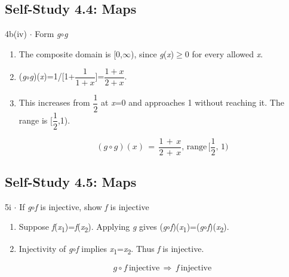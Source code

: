 \documentclass[11pt]{article}
\begin{document}
\begin{keepsection}\subsection{Self-Study 4.4: Maps}

\begin{workedbox}{4b(iv) \ensuremath{\cdot} Form \textit{g}\ensuremath{\circ}\textit{g}}
\begin{enumerate}
\item The composite domain is [0,\ensuremath{\infty}), since \textit{g}(\textit{x})\ensuremath{\geq}0 for every allowed \textit{x}.
\item (\textit{g}\ensuremath{\circ}\textit{g})(\textit{x})=1/[1+{\small\ensuremath{\dfrac{1}{1+{x}}}}]={\small\ensuremath{\dfrac{1+{x}}{2+{x}}}}.
\item {}
This increases from {\small\ensuremath{\dfrac{1}{2}}} at \textit{x}=0 and approaches 1 without reaching it. The range is [{\small\ensuremath{\dfrac{1}{2}}},1).

\begin{equation*}({g}\circ {g})({x})\, =\, \dfrac{1\, +\, {x}}{2\, +\, {x}},\, \text{range}\, [\dfrac{1}{2},\, 1)\end{equation*}
\end{enumerate}
\end{workedbox}

\end{keepsection}
\begin{keepsection}\subsection{Self-Study 4.5: Maps}

\begin{workedbox}{5i \ensuremath{\cdot} If \textit{g}\ensuremath{\circ}\textit{f} is injective, show \textit{f} is injective}
\begin{enumerate}
\item Suppose \textit{f}(\textit{x}\textsubscript{1})=\textit{f}(\textit{x}\textsubscript{2}). Applying \textit{g} gives (\textit{g}\ensuremath{\circ}\textit{f})(\textit{x}\textsubscript{1})=(\textit{g}\ensuremath{\circ}\textit{f})(\textit{x}\textsubscript{2}).
\item {}
Injectivity of \textit{g}\ensuremath{\circ}\textit{f} implies \textit{x}\textsubscript{1}=\textit{x}\textsubscript{2}. Thus \textit{f} is injective.

\begin{equation*}{g}\circ {f}\, \text{injective}\, \Rightarrow \, {f}\, \text{injective}\end{equation*}
\end{enumerate}
\end{workedbox}

\end{keepsection}
\end{document}
